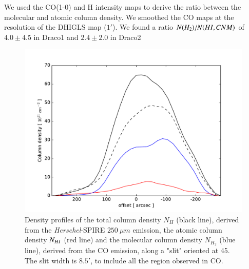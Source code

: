 \documentclass[traditabstract]{aa}
\begin{document}
   We used the CO(1-0) and H intensity maps to derive the ratio between the molecular and atomic column density. We smoothed the CO maps at the resolution of the DHIGLS map ($1'$). We found a ratio $N(H_2)/N(H\rmnum{1},CNM)$ of $4.0\pm 4.5$ in Draco1 and $2.4\pm 2.0$ in Draco2

\begin{figure}[h!]
  \centering
  \includegraphics[width=\linewidth,trim=30 10 55 35,clip=true]{Figures/Column_density_profiles.pdf}
  \caption{\label{Col_density} Density profiles of the total column density $N_H$ (black line), derived from the \emph{Herschel}-SPIRE $250\: \mu m$ emission, the atomic column density $N_{H\rmnum{1}}$ (red line) and the molecular column density $N_{H_2}$ (blue line), derived from the CO emission, along a "slit" oriented at 45\degree. The slit width is $8.5'$, to include all the region observed in CO.}
\end{figure}
\end{document}
